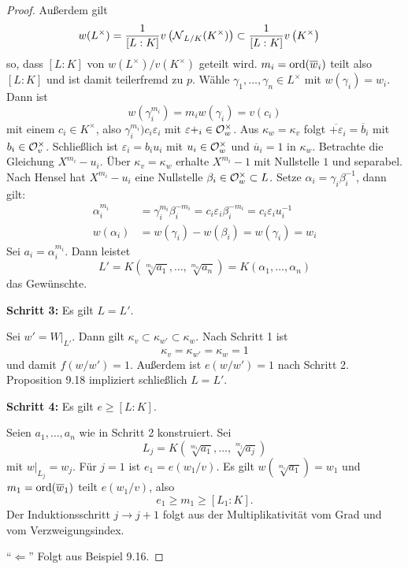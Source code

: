 \begin{proof}
	Außerdem gilt
	\begin{align*}
	w(L^\times)
	&= \frac{1}{[L:K]} v \left( \operatorname{\mathcal{N}}_{L/K}(K^\times) \right)
	\subset \frac{1}{[L:K]} v \left( K^\times \right)
	\end{align*}
	so, dass $[L:K]$ von  $w(L^\times) / v(K^\times)$ geteilt wird.
	$m_i = \operatorname{ord} ( \overline{w}_i )$ teilt also $[L:K]$ und ist damit teilerfremd zu $p$.
	Wähle $\gamma_1,\dots,\gamma_n \in L^\times$ mit $w(\gamma_i) = w_i$.
	Dann ist
	\[ w \left( \gamma_i^{m_i} \right)
	=m_i w(\gamma_i)
	= v(c_i)
	\]
	mit einem $c_i \in K^\times$, also
	$\gamma_i^{m_i} ) c_i \varepsilon_i$ mit $\varepsilon+_i \in \mathcal{O}_w^\times$.
	Aus $\kappa_w = \kappa_v$ folgt $\overline{+\varepsilon}_i = \overline{b}_i$ mit $b_i \in \mathcal{O}_v^\times$. Schließlich ist $\varepsilon_i = b_i u_i$ mit $u_i \in \mathcal{O}_w^\times$ und $\overline{u}_i =1$ in $\kappa_w$.
	Betrachte die Gleichung $X^{m_i} - u_i$. Über $\kappa_v=\kappa_w$ erhalte $X^{m_i} - 1$
	mit Nullstelle $1$ und separabel.
	Nach Hensel hat $X^{m_i} - u_i$ eine Nullstelle $\beta_i \in \mathcal{O}_w^\times \subset L$.
	Setze $\alpha_i = \gamma_i \beta_i^{-1}$, dann gilt:
	\begin{align*}
	\alpha_i^{m_i} 
	&= \gamma_i^{m_i} \beta_i^{-m_i}
	=c_i \varepsilon_i\beta_i^{-m_i}
	= c_i \varepsilon_iu_i^{-1} \\
	w(\alpha_i)
	&= w(\gamma_i) -w(\beta_i)
	=w(\gamma_i)
	=w_i
	\end{align*}
	Sei $a_i = \alpha_i^{m_i}$. Dann leistet
	\[ L' = K(\sqrt[m_1]{a_1}, \dots, \sqrt[m_n]{a_n})
	=K(\alpha_1,\dots,\alpha_n)
	\]
	das Gewünschte.
	
	\bigskip\textbf{Schritt 3:} Es gilt $L=L'$.
	
	Sei $w'=W|_{L'}$. Dann gilt $\kappa_v \subset \kappa_{w'} \subset \kappa_w$.
	Nach Schritt 1 ist
	\[ \kappa_v = \kappa_{w'} = \kappa_w = 1
	\]
	und damit $f(w/w') =1$. Außerdem ist $e(w/w') = 1$ nach Schritt 2.
	Proposition 9.18 impliziert schließlich $L=L'$.
	
	\bigskip\textbf{Schritt 4:} Es gilt $e\geq [L:K]$.
	
	Seien $a_1, \dots, a_n$ wie in Schritt 2 konstruiert. Sei
	\[ L_j = K\left( \sqrt[m_1]{a_1}, \dots, \sqrt[m_j]{a_j} \right)
	\]
	mit $w|_{L_j} = w_j$. Für $j=1$ ist $e_1 = e(w_1/v)$. Es gilt
	$w\left( \sqrt[m_1]{a_1} \right) = w_1$ und $m_1 = \operatorname{ord} (\overline{w}_1)$ teilt $e(w_1/v)$, also
	\[ e_1 \geq m_1 \geq [L_1:K].
	\]
	Der Induktionsschritt $j\to j+1$ folgt aus der Multiplikativität vom Grad und vom Verzweigungsindex.
	
	\bigskip \enquote{$\Leftarrow$} Folgt aus Beispiel 9.16.
\end{proof}




